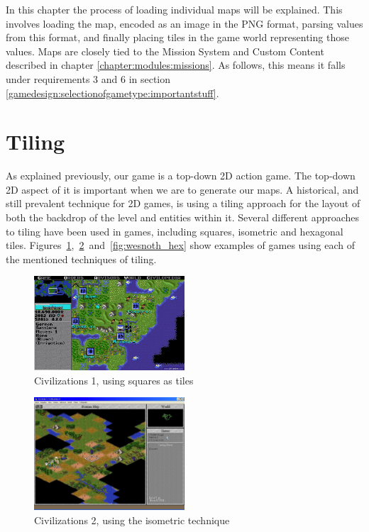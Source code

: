 In this chapter the process of loading individual maps will be explained.
This involves loading the map, encoded as an image in the PNG format, parsing values from this format, and finally placing tiles in the game world representing those values.
Maps are closely tied to the Mission System and Custom Content described in chapter \ref{chapter:modules:missions}.
As follows, this means it falls under requirements 3 and 6 in section \ref{gamedesign:selectionofgametype:importantstuff}.

\section{Tiling}
As explained previously, our game is a top-down 2D action game.
The top-down 2D aspect of it is important when we are to generate our maps.
A historical, and still prevalent technique for 2D games, is using a tiling approach for the layout of both the backdrop of the level and entities within it.
Several different approaches to tiling have been used in games, including squares, isometric and hexagonal tiles.
Figures~\ref{fig:civ-1_square},~\ref{fig:civ-2_iso}~and~\ref{fig:wesnoth_hex}
show examples of games using each of the mentioned techniques of tiling.

\begin{figure}[H]
    \centering
    \includegraphics[width=0.5\textwidth]{figures/generating_levels/civ-1_square.png}
    \caption{Civilizations 1, using squares as tiles}\label{fig:civ-1_square}
\end{figure}

\begin{figure}[H]
    \centering
    \includegraphics[width=0.5\textwidth]{figures/generating_levels/civ-2_iso.png}
    \caption{Civilizations 2, using the isometric technique}\label{fig:civ-2_iso}
\end{figure}

